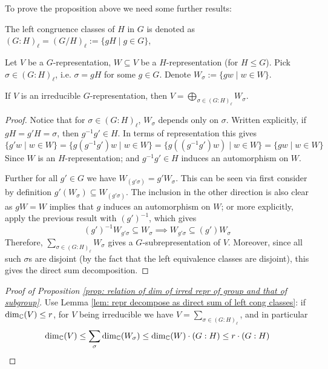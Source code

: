 \textstart
To prove the proposition above we need some further results:

\begin{notation}
    The left congruence classes of $H$ in $G$ is denoted as $(G : H)_{\ell} = (G/H)_{\ell} := \{gH \mid g \in G\}$, 
\end{notation}

\begin{lemma}\label{lem: repr decompose as direct sum of left cong classes}
    Let $V$ be a $G$-representation, $W \subseteq V$ be a $H$-representation (for $H \leq G$). Pick $\sigma \in (G : H)_{\ell}$, i.e. $\sigma = gH$ for some $g \in G$. Denote $W_{\sigma} := \{ gw \mid w \in W \}$.

    If $V$ is an irreducible $G$-representation, then $V = \bigoplus_{\sigma \in (G : H)_{\ell}} W_{\sigma}$.
\end{lemma}

\begin{proof}
    Notice that for $\sigma \in (G : H)_{\ell}$, $W_{\sigma}$ depends only on $\sigma$. Written explicitly, if $gH = g'H = \sigma$, then $g^{-1} g' \in H$. In terms of representation this gives
    \[
        \{ g' w \mid w \in W \} = \{ g (g^{-1} g')w \mid w \in W \} = \{ g((g^{-1} g') w) \mid w \in W \} = \{ gw \mid w \in W \}
    \]
    Since $W$ is an $H$-representation; and $g^{-1} g' \in H$ induces an automorphism on $W$.

    Further for all $g' \in G$ we have $W_{(g' \sigma)} = g' W_{\sigma}$. This can be seen via first consider by definition $g'(W_{\sigma}) \subseteq W_{(g' \sigma)}$. The inclusion in the other direction is also clear as $gW = W$ implies that $g$ induces an automorphism on $W$; or more explicitly, apply the previous result with $(g')^{-1}$, which gives
    \[
        (g')^{-1} W_{g' \sigma} \subseteq W_{\sigma} \implies W_{g' \sigma} \subseteq (g') W_{\sigma}
    \]
    Therefore, $\sum_{\sigma \in (G : H)_{\ell}} W_{\sigma}$ gives a $G$-subrepresentation of $V$. Moreover, since all such $\sigma$s are disjoint (by the fact that the left equivalence classes are disjoint), this gives the direct sum decomposition.
\end{proof}

\begin{proof}[Proof of Proposition \ref{prop: relation of dim of irred repr of group and that of subgroup}]
    Use Lemma \ref{lem: repr decompose as direct sum of left cong classes}: if $\dim_{\mathbb{C}}(V) \leq r$, for $V$ being irreducible we have $V = \sum_{\sigma \in (G : H)_{\ell}}$, and in particular
    \[
        \dim_{\mathbb{C}}(V) \leq \sum_{\sigma} \dim_{\mathbb{C}}(W_{\sigma}) \leq \dim_{\mathbb{C}}(W) \cdot (G : H) \leq r \cdot (G : H)
    \]
\end{proof}

